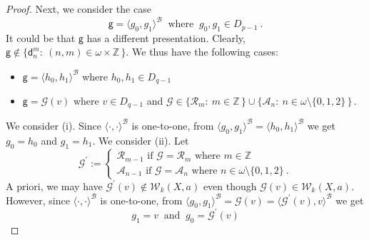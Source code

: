 \documentclass[10pt,a4paper, openany,  oldfontcommands]{memoir}
\newtheorem{open problem} [theorem] {Open Problem}
\newtheorem{open question} [theorem] {Open Question}
\begin{document}
\begin{proof}
 
 
 
 
 
 
 
 Next,  we consider the case  
 \[
   \mathsf{g}   = \langle  g_0   ,      g_1   \rangle^{  \mathcal{B}  }    
   \     \mbox{  where   }    \     g_0, g_1  \in D_{p-1}  
   \      .
   \]
  It could be that  $  \mathsf{g}   $  has a different presentation. 
 Clearly,    $  \mathsf{g}   \not\in   \big\{  \mathsf{d}^m_n :   \   (n, m)  \in  \omega  \times  \mathbb{Z}  \,  \rbrace  $. 
 We thus have the following cases: 
 \begin{itemize}
 \item[(i)]  $  \mathsf{g}   = \langle  h_0   ,      h_1   \rangle^{  \mathcal{B}  }    $   where   $ h_0, h_1  \in D_{ q-1}  $
 
 
 \item[(ii) ]   $  \mathsf{g} =  \mathcal{G} \left( v  \right)  $  where  $  v  \in D_{ q-1}  $   and  
  $  \mathcal{G}  \in    \lbrace  \mathcal{R}_m   :  \   m  \in  \mathbb{Z} \,   \rbrace   \cup 
 \lbrace  \mathcal{A}_n :  \   n  \in    \omega  \setminus \lbrace 0, 1 ,  2   \rbrace  \,   \rbrace       \,   $.
 \end{itemize}
 We consider (i). 
 Since $  \langle  \cdot  ,  \cdot   \rangle^{  \mathcal{B} }  $  is one-to-one,  
from $  \langle  g_0   ,      g_1   \rangle^{  \mathcal{B}  }      = \langle  h_0   ,      h_1   \rangle^{  \mathcal{B}  }    $
we get  $  g_0 = h_0  $  and  $  g_1 = h_1  $.
We   consider (ii). 
Let  
\[
\mathcal{G}^{  \prime  }  :=   \begin{cases}
\mathcal{R}_{ m-1}      \mbox{  if  }     \mathcal{G} =  \mathcal{R}_m   \mbox{  where  }  m  \in  \mathbb{Z}
\\
\mathcal{A}_{ n-1}      \mbox{  if  }     \mathcal{G} =  \mathcal{A}_n   \mbox{  where  }  n  \in  \omega \setminus  \lbrace 0, 1 , 2  \rbrace 
\      .
\end{cases}
\]
A priori,  we may have  $ \mathcal{G}^{  \prime  }  \left(  v  \right)  \not\in  \mathcal{W}_k  \left(  X,  a  \right)     $
even though    $ \mathcal{G}  \left(  v  \right)    \in  \mathcal{W}_k  \left(  X,  a  \right)     $. 
However,   since $  \langle  \cdot  ,  \cdot   \rangle^{  \mathcal{B} }  $  is one-to-one,  
from   $   \langle  g_0   ,      g_1   \rangle^{  \mathcal{B}  }    =   \mathcal{G}  \left(  v  \right)  
=  \langle  \mathcal{G}^{  \prime  }  \left(  v  \right)    ,  v  \rangle^{  \mathcal{B}  }
$ 
we get   
\[
   g_1  =  v      \   \mbox{  and   }    \     g_0  =    \mathcal{G}^{  \prime  }  \left(  v  \right)   
\]
\end{proof}
\end{document}
